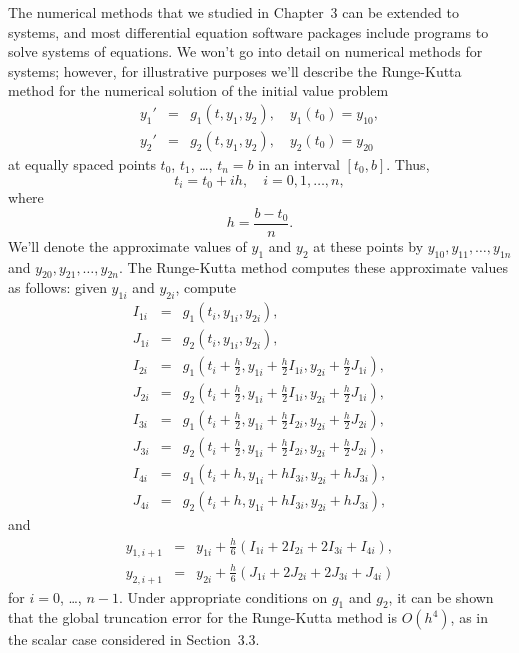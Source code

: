 \noindent
The numerical methods that we studied in Chapter~3 can be extended to systems, and most differential
equation software packages include programs to solve systems of equations. We won't go into detail
on numerical methods for systems; however, for illustrative purposes we'll describe the Runge-Kutta
method for the numerical solution of the initial value problem
\begin{eqnarray*}
  y_{1}' & = & g_{1}(t,y_{1},y_{2}),\quad y_{1}(t_{0})=y_{10}, \\
  y_{2}' & = & g_{2}(t,y_{1},y_{2}),\quad y_{2}(t_{0})=y_{20}
\end{eqnarray*}
at equally spaced points $t_{0}$, $t_{1}$, \dots, $t_{n}=b$ in an interval $[t_{0},b]$. Thus,
\[
  t_{i}=t_{0}+ih,\quad i=0,1,\dots,n,
\]
where
\[
  h=\frac{b-t_{0}}{n}.
\]
We'll denote the approximate values of $y_{1}$ and $y_{2}$ at these points by
$y_{10},y_{11},\dots,y_{1n}$ and $y_{20},y_{21},\dots,y_{2n}$. The Runge-Kutta method computes these
approximate values as follows: given $y_{1i}$ and $y_{2i}$, compute
\begin{eqnarray*}
  I_{1i} & = & g_{1}(t_{i},y_{1i},y_{2i}),                                                            \\
  J_{1i} & = & g_{2}(t_{i},y_{1i},y_{2i}),                                                            \\
  I_{2i} & = & g_{1}\left(t_{i}+\frac{h}{2},y_{1i}+\frac{h}{2}I_{1i},y_{2i}+\frac{h}{2}J_{1i}\right), \\
  J_{2i} & = & g_{2}\left(t_{i}+\frac{h}{2},y_{1i}+\frac{h}{2}I_{1i},y_{2i}+\frac{h}{2}J_{1i}\right), \\
  I_{3i} & = & g_{1}\left(t_{i}+\frac{h}{2},y_{1i}+\frac{h}{2}I_{2i},y_{2i}+\frac{h}{2}J_{2i}\right), \\
  J_{3i} & = & g_{2}\left(t_{i}+\frac{h}{2},y_{1i}+\frac{h}{2}I_{2i},y_{2i}+\frac{h}{2}J_{2i}\right), \\
  I_{4i} & = & g_{1}(t_{i}+h,y_{1i}+hI_{3i},y_{2i}+hJ_{3i}),                                          \\
  J_{4i} & = & g_{2}(t_{i}+h,y_{1i}+hI_{3i},y_{2i}+hJ_{3i}),
\end{eqnarray*}
and
\begin{eqnarray*}
  y_{1,i+1} & = & y_{1i}+\frac{h}{6}(I_{1i}+2I_{2i}+2I_{3i}+I_{4i}), \\
  y_{2,i+1} & = & y_{2i}+\frac{h}{6}(J_{1i}+2J_{2i}+2J_{3i}+J_{4i})
\end{eqnarray*}
for $i=0$, \dots, $n-1$. Under appropriate conditions on $g_{1}$ and $g_{2}$, it can be shown that
the global truncation error for the Runge-Kutta method is $O(h^{4})$, as in the scalar case
considered in Section~3.3.

